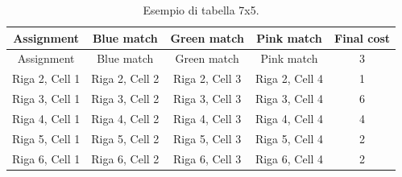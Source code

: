\begin{table}[H]
  \centering
  \begin{tabular}{|c|c|c|c|c|}
    \hline
    Assignment & Blue match & Green match & Pink match & Final cost \\
    \hline
    Assignment & Blue match & Green match & Pink match & 3 \\
    \hline
    Riga 2, Cell 1 & Riga 2, Cell 2 & Riga 2, Cell 3 & Riga 2, Cell 4 & 1 \\
    \hline
    Riga 3, Cell 1 & Riga 3, Cell 2 & Riga 3, Cell 3 & Riga 3, Cell 4 & 6 \\
    \hline
    Riga 4, Cell 1 & Riga 4, Cell 2 & Riga 4, Cell 3 & Riga 4, Cell 4 & 4 \\
    \hline
    Riga 5, Cell 1 & Riga 5, Cell 2 & Riga 5, Cell 3 & Riga 5, Cell 4 & 2 \\
    \hline
    Riga 6, Cell 1 & Riga 6, Cell 2 & Riga 6, Cell 3 & Riga 6, Cell 4 & 2 \\
    \hline
  \end{tabular}
  \caption{Esempio di tabella 7x5.}
  \label{tab:tabella7x5}
\end{table}

